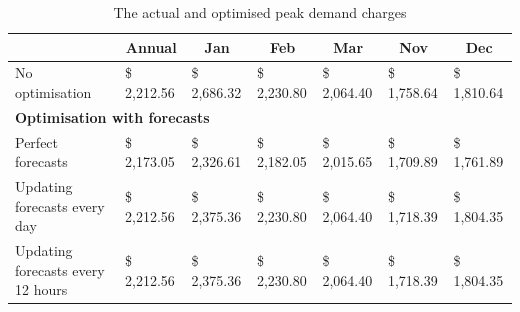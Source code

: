 \begin{landscape}
\begin{table}[tb]
	\label{tab:pdm:exp:costs}
	\caption{The actual and optimised peak demand charges}
	\begin{tabularx}{\linewidth}
		{@{}l X X X X X X@{}}
		\toprule
		\multicolumn{1}{l|}{}                                    & \multicolumn{1}{c}{\textbf{Annual}} & \multicolumn{1}{c}{\textbf{Jan}} & \multicolumn{1}{c}{\textbf{Feb}} & \multicolumn{1}{c}{\textbf{Mar}} & \multicolumn{1}{c}{\textbf{Nov}} & \multicolumn{1}{c}{\textbf{Dec}} \\\midrule
		\multicolumn{1}{l|}{No optimisation}                     & \$   2,212.56                       & \$   2,686.32                    & \$   2,230.80                    & \$   2,064.40                    & \$   1,758.64                    & \$   1,810.64                    \\\midrule
		\multicolumn{7}{l}{\textbf{Optimisation with forecasts}}                                                                                                                                                                                                                               \\\midrule
		\multicolumn{1}{l|}{Perfect forecasts}                   & \$   2,173.05                       & \$   2,326.61                    & \$   2,182.05                    & \$   2,015.65                    & \$   1,709.89                    & \$   1,761.89                    \\
		\multicolumn{1}{l|}{Updating forecasts every day}        & \$   2,212.56                       & \$   2,375.36                    & \$   2,230.80                    & \$   2,064.40                    & \$   1,718.39                    & \$   1,804.35                    \\
		\multicolumn{1}{l|}{Updating forecasts every 12 hours}   & \$   2,212.56                       & \$   2,375.36                    & \$   2,230.80                    & \$   2,064.40                    & \$   1,718.39                    & \$   1,804.35                    \\

\end{tabularx}
\end{table}
\end{landscape}
